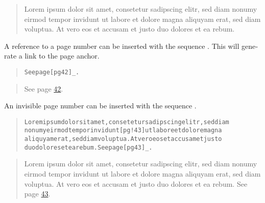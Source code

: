 \documentclass[a5paper]{book}
\begin{document}
\begin{german}
\begin{quotation}\noindent
\begin{container}
Lorem ipsum dolor sit amet, consetetur sadipscing elitr, sed diam
nonumy eirmod tempor invidunt 
ut labore et dolore magna
aliquyam erat, sed diam voluptua. At vero eos et accusam et justo
duo dolores 
et ea rebum.\par
\end{container}
\end{quotation}

{\noindent}A reference to a page number can be inserted with the sequence
{\ttfamily{{[}pg n{]}\_}}. This will generate a link to the page anchor.\par

\begin{quote}
\begin{alltt}
See page {[}pg 42{]}\_.
\end{alltt}
\end{quote}

\begin{quotation}\noindent
\begin{container}
See page \hyperlink{page-42}{42}.\par
\end{container}
\end{quotation}

{\noindent}An invisible page number can be inserted with the sequence
{\ttfamily{{[}pg!n{]}}}.\par

\begin{quote}
\begin{alltt}
Lorem ipsum dolor sit amet, consetetur sadipscing elitr, sed diam
nonumy eirmod tempor invidunt {[}pg!43{]} ut labore et dolore magna
aliquyam erat, sed diam voluptua. At vero eos et accusam et justo
duo dolores et ea rebum. See page {[}pg 43{]}\_.
\end{alltt}
\end{quote}

\begin{quotation}\noindent
\begin{container}
Lorem ipsum dolor sit amet, consetetur sadipscing elitr, sed diam
nonumy eirmod tempor invidunt 
ut labore et dolore magna
aliquyam erat, sed diam voluptua. At vero eos et accusam et justo
duo dolores et ea rebum. See page \hyperlink{page-43}{43}.\par
\end{container}
\end{quotation}


\end{german}
\end{document}

